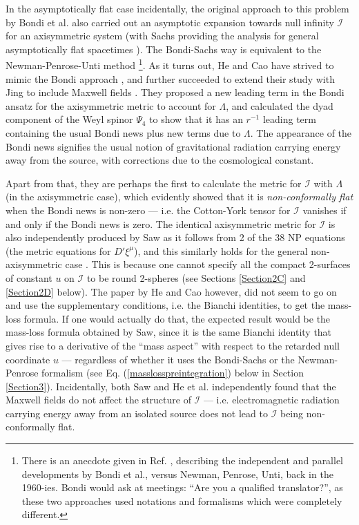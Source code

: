 \documentclass[aps,pre,preprint,superscriptaddress,showpacs,showkeys]{revtex4-1}
\begin{document}
In the asymptotically flat case incidentally, the original approach to this problem by Bondi et al. \cite{Bondi62} also carried out an asymptotic expansion towards null infinity $\mathcal{I}$ for an axisymmetric system (with Sachs providing the analysis for general asymptotically flat spacetimes \cite{Sachs62}). The Bondi-Sachs way is equivalent to the Newman-Penrose-Unti method \footnote{There is an anecdote given in Ref. \cite{MadWini}, describing the independent and parallel developments by Bondi et al., versus Newman, Penrose, Unti, back in the 1960-ies. Bondi would ask at meetings: ``Are you a qualified translator?'', as these two approaches used notations and formalisms which were completely different.}. As it turns out, He and Cao have strived to mimic the Bondi approach \cite{chi1}, and further succeeded to extend their study with Jing to include Maxwell fields \cite{chi2}. They proposed a new leading term in the Bondi ansatz for the axisymmetric metric to account for $\Lambda$, and calculated the dyad component of the Weyl spinor $\Psi_4$ to show that it has an $r^{-1}$ leading term containing the usual Bondi news plus new terms due to $\Lambda$. The appearance of the Bondi news signifies the usual notion of gravitational radiation carrying energy away from the source, with corrections due to the cosmological constant.

Apart from that, they are perhaps the first to calculate the metric for $\mathcal{I}$ with $\Lambda$ (in the axisymmetric case), which evidently showed that it is \emph{non-conformally flat} when the Bondi news is non-zero --- i.e. the Cotton-York tensor for $\mathcal{I}$ vanishes if and only if the Bondi news is zero. The identical axisymmetric metric for $\mathcal{I}$ is also independently produced by Saw as it follows from 2 of the 38 NP equations (the metric equations for $D'\xi^\mu$), and this similarly holds for the general non-axisymmetric case \cite{Vee2016}. This is because one cannot specify all the compact 2-surfaces of constant $u$ on $\mathcal{I}$ to be round 2-spheres (see Sections \ref{Section2C} and \ref{Section2D} below). The paper by He and Cao \cite{chi1} however, did not seem to go on and use the supplementary conditions, i.e. the Bianchi identities, to get the mass-loss formula. If one would actually do that, the expected result would be the mass-loss formula obtained by Saw, since it is the same Bianchi identity that gives rise to a derivative of the ``mass aspect'' with respect to the retarded null coordinate $u$ --- regardless of whether it uses the Bondi-Sachs or the Newman-Penrose formalism (see Eq. (\ref{masslosspreintegration}) below in Section \ref{Section3}). Incidentally, both Saw \cite{Vee2017} and He et al. \cite{chi2} independently found that the Maxwell fields do not affect the structure of $\mathcal{I}$ --- i.e. electromagnetic radiation carrying energy away from an isolated source does not lead to $\mathcal{I}$ being non-conformally flat.
\end{document}
